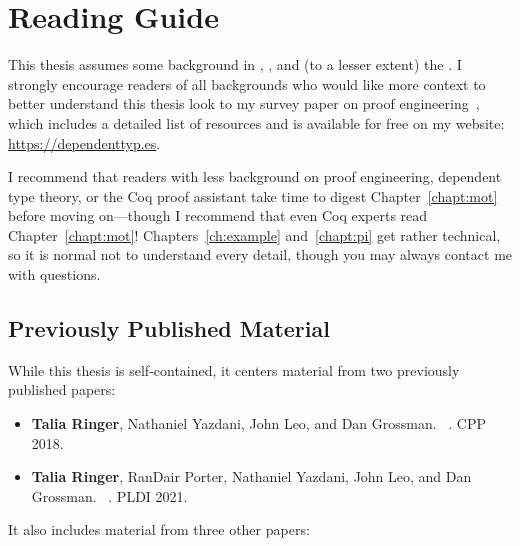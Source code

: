 \section{Reading Guide}
\label{sec:guide}


This thesis assumes some background in , , and (to a lesser extent) the  . 
I strongly encourage readers of all backgrounds who would like more context to better understand this thesis
look to my survey paper on proof engineering~\cite{PGL-045}, which includes a detailed list of resources
and is available for free on my website: \url{https://dependenttyp.es}.

I recommend that readers with less background on proof engineering, dependent type theory, or the Coq proof assistant
take time to digest Chapter~\ref{chapt:mot} before moving on---though I recommend that even Coq experts read Chapter~\ref{chapt:mot}!
Chapters~\ref{ch:example} and~\ref{chapt:pi} get rather technical, so it is normal not to understand every detail,
though you may always contact me with questions.

\subsection*{Previously Published Material}

While this thesis is self-contained, it centers material from two previously published papers:

\begin{itemize}
\item \textbf{Talia Ringer}, Nathaniel Yazdani, John Leo, and Dan Grossman. ~\cite{ringer2018adapting}. CPP 2018.
\item \textbf{Talia Ringer}, RanDair Porter, Nathaniel Yazdani, John Leo, and Dan Grossman. ~\cite{Ringer2021}. PLDI 2021.
\end{itemize}
It also includes material from three other papers:

